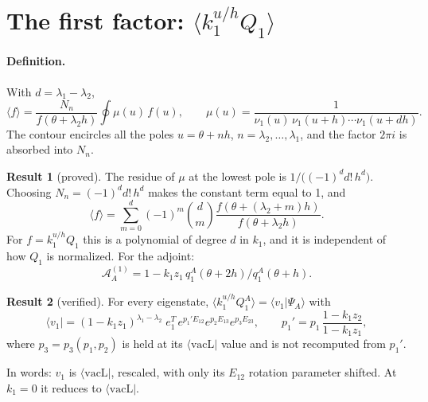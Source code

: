 \documentclass[11pt]{article}
\newcommand{\vacL}{\langle\mathrm{vacL}|}
\theoremstyle{definition}
\newtheorem{result}{Result}
\theoremstyle{remark}
\begin{document}
\section{The first factor: $\langle k_1^{u/h}Q_1\rangle$}\label{sec:first}

\paragraph{Definition.}
With $d=\lambda_1-\lambda_2$,
\begin{equation}
\langle f\rangle=\frac{N_n}{f(\theta+\lambda_2h)}\oint\mu(u)\,f(u),\qquad
\mu(u)=\frac{1}{\nu_1(u)\,\nu_1(u+h)\cdots\nu_1(u+dh)} .
\end{equation}
The contour encircles all the poles $u=\theta+nh$, $n=\lambda_2,\dots,\lambda_1$, and the factor $2\pi i$ is absorbed into $N_n$.

\begin{result}[proved]\label{res:fd}
The residue of $\mu$ at the lowest pole is $1/\big((-1)^d d!\,h^d\big)$. Choosing $N_n=(-1)^d d!\,h^d$ makes the constant term equal to 1, and
\begin{equation}
\langle f\rangle=\sum_{m=0}^{d}(-1)^m\binom{d}{m}\frac{f(\theta+(\lambda_2+m)h)}{f(\theta+\lambda_2h)} .
\end{equation}
For $f=k_1^{u/h}Q_1$ this is a polynomial of degree $d$ in $k_1$, and it is independent of how $Q_1$ is normalized. For the adjoint:
\begin{equation}
\mathcal A^{(1)}_A=1-k_1z_1\,q^A_1(\theta+2h)/q^A_1(\theta+h).
\end{equation}
\end{result}

\begin{result}[verified]\label{res:v1}
For every eigenstate, $\langle k_1^{u/h}Q_1^A\rangle=\langle v_1|\Psi_A\rangle$ with
\begin{equation}
\langle v_1|=(1-k_1z_1)^{\lambda_1-\lambda_2}\;e_1^T\,e^{p_1'E_{12}}e^{p_2E_{13}}e^{p_3E_{23}},\qquad
p_1'=p_1\,\frac{1-k_1z_2}{1-k_1z_1},
\end{equation}
where $p_3=p_3(p_1,p_2)$ is held at its $\vacL$ value and is not recomputed from $p_1'$.

In words: $v_1$ is $\vacL$, rescaled, with only its $E_{12}$ rotation parameter shifted. At $k_1=0$ it reduces to $\vacL$.
\end{result}
\end{document}
